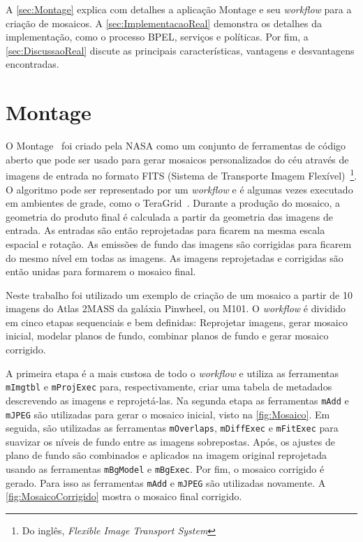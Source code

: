 \documentclass[12pt]{report} %
\begin{document}
    A \autoref{sec:Montage} explica com detalhes a aplicação Montage e seu \textit{workflow} para a criação de mosaicos.
    A \autoref{sec:ImplementacaoReal} demonstra os detalhes da implementação, como o processo BPEL, serviços e políticas.
    Por fim, a \autoref{sec:DiscussaoReal} discute as principais características, vantagens e desvantagens encontradas. 
    
    \section{Montage}
    \label{sec:Montage}
	O Montage~\cite{Montage:website} foi criado pela NASA como um conjunto de ferramentas de código aberto que pode ser usado para gerar mosaicos personalizados do céu através de imagens de entrada no formato FITS (Sistema de Transporte Imagem Flexível)~\footnote{Do inglês, \textit{Flexible Image Transport System}}.
	O algoritmo pode ser representado por um \textit{workflow} e é algumas vezes executado em ambientes de grade, como o TeraGrid~\cite{TeraGrid:website}.
	Durante a produção do mosaico, a geometria do produto final é calculada a partir da geometria das imagens de entrada.
	As entradas são então reprojetadas para ficarem na mesma escala espacial e rotação.
	As emissões de fundo das imagens são corrigidas para ficarem do mesmo nível em todas as imagens.
	As imagens reprojetadas e corrigidas são então unidas para formarem o mosaico final.
	
	Neste trabalho foi utilizado um exemplo de criação de um mosaico a partir de 10 imagens do Atlas 2MASS da galáxia Pinwheel, ou M101.
	O \textit{workflow} é dividido em cinco etapas sequenciais e bem definidas: Reprojetar imagens, gerar mosaico inicial, modelar planos de fundo, combinar planos de fundo e gerar mosaico corrigido.
	
	A primeira etapa é a mais custosa de todo o \textit{workflow} e utiliza as ferramentas \texttt{mImgtbl} e \texttt{mProjExec} para, respectivamente, criar uma tabela de metadados descrevendo as imagens e reprojetá-las.
	Na segunda etapa as ferramentas \texttt{mAdd} e \texttt{mJPEG} são utilizadas para gerar o mosaico inicial, visto na \autoref{fig:Mosaico}.
	Em seguida, são utilizadas as ferramentas \texttt{mOverlaps}, \texttt{mDiffExec} e \texttt{mFitExec} para suavizar os níveis de fundo entre as imagens sobrepostas.
	Após, os ajustes de plano de fundo são combinados e aplicados na imagem original reprojetada usando as ferramentas  \texttt{mBgModel} e \texttt{mBgExec}.
	Por fim, o mosaico corrigido é gerado. Para isso as ferramentas \texttt{mAdd} e \texttt{mJPEG} são utilizadas novamente.
	A \autoref{fig:MosaicoCorrigido} mostra o mosaico final corrigido.
	
\end{document}
